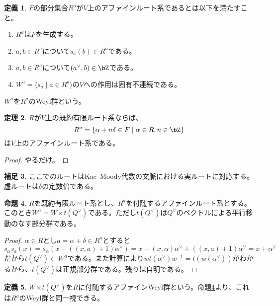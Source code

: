 \documentclass[uplatex, a4paper, dvipdfmx]{jsarticle}
\theoremstyle{definition}
\newtheorem{theorem}{定理}[section]
\newtheorem{definition}[theorem]{定義}
\newtheorem{proposition}[theorem]{命題}
\newtheorem{remark}[theorem]{補足}
\begin{document}
\begin{definition}
    $F$の部分集合$R^a$が$V$上のアファインルート系であるとは以下を満たすこと。
    \begin{enumerate}
        \item $R^a$は$F$を生成する。
        \item $a, b \in R^a$について$s_a(b) \in R^a$である。
        \item $a, b \in R^a$について$(a^\vee, b) \in \bZ$である。
        \item $W^a = \langle s_a \mid a \in R^a \rangle$の$V$への作用は固有不連続である。
    \end{enumerate}
    $W^a$を$R^a$のWeyl群という。
\end{definition}

\begin{theorem}
    $R$が$V$上の既約有限ルート系ならば、
    \begin{equation}
        R^a = \{\alpha + n \delta \in F \mid \alpha \in R, n \in \bZ\}
    \end{equation}
    は$V$上のアファインルート系である。
\end{theorem}
\begin{proof}
    やるだけ。
\end{proof}
\begin{remark}
    ここでのルートはKac--Moody代数の文脈における実ルートに対応する。虚ルートは$\delta$の定数倍である。
\end{remark}
\begin{proposition}\label{prop:structure-of-affine-weyl-group}
    $R$を既約有限ルート系とし、$R^a$を付随するアファインルート系とする。このとき$W^a = W \ltimes t(Q^\vee)$である。ただし$t(Q^\vee)$は$Q^\vee$のベクトルによる平行移動のなす部分群である。
\end{proposition}
\begin{proof}
    $\alpha \in R$とし$a = \alpha + \delta \in R^a$とすると
    \begin{equation}
        s_\alpha s_a(x) = s_\alpha(x - ((x, a) + 1) \alpha^\vee) = x - (x, \alpha)\alpha^\vee + ((x, a) + 1) \alpha^\vee = x + \alpha^\vee
    \end{equation}
    だから$t(Q^\vee) \subset W^a$である。また計算により$wt(\alpha^\vee)w^{-1} = t(w(\alpha^\vee))$がわかるから、$t(Q^\vee)$は正規部分群である。残りは自明である。
\end{proof}
\begin{definition}
    $W \ltimes t(Q^\vee)$を$R$に付随するアファインWeyl群という。命題\ref{prop:structure-of-affine-weyl-group}より、これは$R^a$のWeyl群と同一視できる。
\end{definition}
\end{document}
